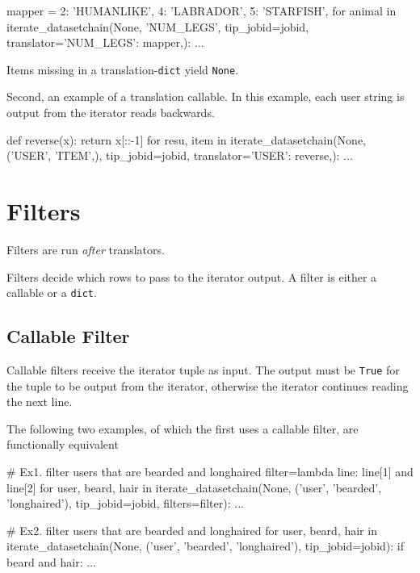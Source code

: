 \begin{python}
mapper = {2: 'HUMANLIKE', 4: 'LABRADOR', 5: 'STARFISH',}
for animal in iterate_datasetchain(None, 'NUM_LEGS', tip_jobid=jobid,
                                     translator={'NUM_LEGS': mapper,}):
    ...
\end{python}
Items missing in a translation-\texttt{dict} yield \texttt{None}.

Second, an example of a translation callable.  In this example, each
user string is output from the iterator reads backwards.

\begin{python}
def reverse(x):
    return x[::-1]
for resu, item in iterate_datasetchain(None, ('USER', 'ITEM',), tip_jobid=jobid,
                                       translator={'USER': reverse,}):
    ...
\end{python}



\section{Filters}

Filters are run \emph{after} translators.

Filters decide which rows to pass to the iterator output.  A filter is
either a callable or a \texttt{dict}.


\subsection*{Callable Filter}

Callable filters receive the iterator tuple as input.  The output must
be \texttt{True} for the tuple to be output from the iterator,
otherwise the iterator continues reading the next line.

The following two examples, of which the first uses a callable filter,
are functionally equivalent

\begin{python}
# Ex1.  filter users that are bearded and longhaired
filter=lambda line: line[1] and line[2]
for user, beard, hair in iterate_datasetchain(None, ('user', 'bearded', 'longhaired'),
                                       tip_jobid=jobid, filters=filter):
    ...

# Ex2.  filter users that are bearded and longhaired
for user, beard, hair in iterate_datasetchain(None, ('user', 'bearded', 'longhaired'),
                                       tip_jobid=jobid):
    if beard and hair:
        ...
\end{python}




